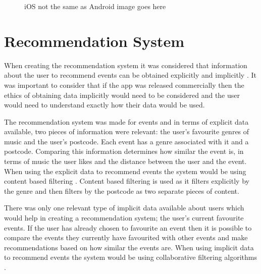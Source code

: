 \begin{figure} [H]
\caption{iOS not the same as Android image goes here}
\end{figure}


\section{Recommendation System}
When creating the recommendation system it was considered that information about the user to recommend events can be obtained explicitly and implicitly \cite{ML}. It was important to consider that if the app was released commercially then the ethics of obtaining data implicitly would need to be considered and the user would need to understand exactly how their data would be used.

The recommendation system was made for events and in terms of explicit data available, two pieces of information were relevant: the user's favourite genres of music and the user's postcode. Each event has a genre associated with it and a postcode. Comparing this information determines how similar the event is, in terms of music the user likes and the distance between the user and the event. When using the explicit data to recommend events the system would be using content based filtering \cite{san}. Content based filtering is used as it filters explicitly by the genre and then filters by the postcode as two separate pieces of content.

There was only one relevant type of implicit data available about users which would help in creating a recommendation system; the user's current favourite events. If the user has already chosen to favourite an event then it is possible to compare the events they currently have favourited with other events and make recommendations based on how similar the events are. When using implicit data to recommend events the system would be using collaborative filtering algorithms \cite{collab}.

